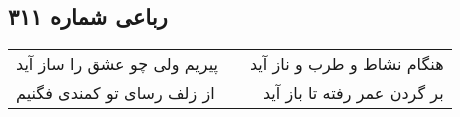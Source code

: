 \begin{center}
\section*{رباعی شماره ۳۱۱}
\label{sec:sh311}
\begin{longtable}{l p{0.5cm} r}
پیریم ولی چو عشق را ساز آید
&&
هنگام نشاط و طرب و ناز آید
\\
از زلف رسای تو کمندی فگنیم
&&
بر گردن عمر رفته تا باز آید
\\
\end{longtable}
\end{center}
